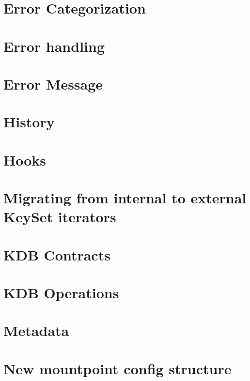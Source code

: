 \let\mypdfximage\pdfximage\def\pdfximage{\immediate\mypdfximage}\documentclass[twoside]{book}
\newcommand{\+}{\discretionary{\mbox{\scriptsize$\hookleftarrow$}}{}{}}
\begin{document}
\chapter{Error Categorization}
\label{doc_dev_error-categorization_md}

\chapter{Error handling}
\label{doc_dev_error-handling_md}

\chapter{Error Message}
\label{doc_dev_error-message_md}

\chapter{History}
\label{doc_dev_history_md}

\chapter{Hooks}
\label{doc_dev_hooks_md}

\chapter{Migrating from internal to external Key\+Set iterators}
\label{doc_dev_iterators_md}

\chapter{KDB Contracts}
\label{doc_dev_kdb-contracts_md}

\chapter{KDB Operations}
\label{doc_dev_kdb-operations_md}

\chapter{Metadata}
\label{doc_dev_metadata_md}

\chapter{New mountpoint config structure}
\label{doc_dev_mountpoints_md}

\end{document}
